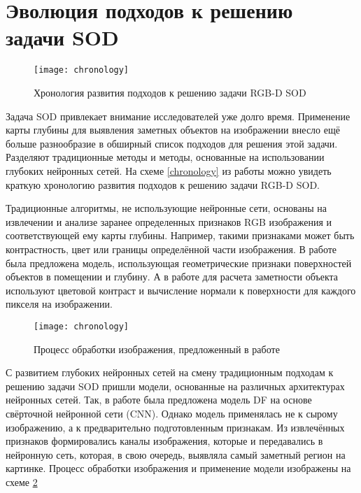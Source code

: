\section{Эволюция подходов к решению задачи SOD}

\begin{figure}[h]
    \centering
    \texttt{[image: chronology]}
    \caption{Хронология развития подходов к решению задачи RGB-D SOD}
    \label{fig:chronology}
\end{figure}

Задача SOD привлекает внимание исследователей уже долго время. Применение карты глубины для выявления заметных объектов на изображении 
внесло ещё больше разнообразие в обширный список подходов для решения этой задачи. Разделяют традиционные методы и методы, основанные 
на использовании глубоких нейронных сетей. На схеме \ref{chronology} из работы \cite{Survey} можно увидеть краткую хронологию развития
подходов к решению задачи RGB-D SOD.


Традиционные алгоритмы, не использующие нейронные сети, основаны на извлечении и анализе заранее определенных признаков RGB изображения и соответствующей ему карты глубины.
Например, такими признаками может быть контрастность, цвет или границы определённой части изображения. 
В работе \cite{Depth-really-Matters} была предложена модель, использующая геометрические признаки поверхностей объектов в помещении и глубину. 
А в работе \cite{Depth-View-of-Saliency} для расчета заметности объекта используют цветовой контраст и вычисление нормали к поверхности\cite{Surface-Normal} для каждого пикселя на изображении.

\begin{figure}[h]
    \centering
    \texttt{[image: chronology]}
    \caption{Процесс обработки изображения, предложенный в работе \cite{RGBD-SOD-Deep-Fusion}}
    \label{fig:pipeline}
\end{figure}

С развитием глубоких нейронных сетей на смену традиционным подходам к решению задачи SOD пришли модели, основанные на различных архитектурах нейронных сетей.
Так, в работе \cite{RGBD-SOD-Deep-Fusion} была предложена модель DF на основе свёрточной нейронной сети (CNN). Однако модель применялась не к сырому изображению, 
а к предварительно подготовленным признакам. Из извлечённых признаков формировались каналы изображения, которые и передавались в нейронную сеть, которая, в свою очередь,
выявляла самый заметный регион на картинке. Процесс обработки изображения и применение модели изображены на схеме \ref{fig:pipeline}


